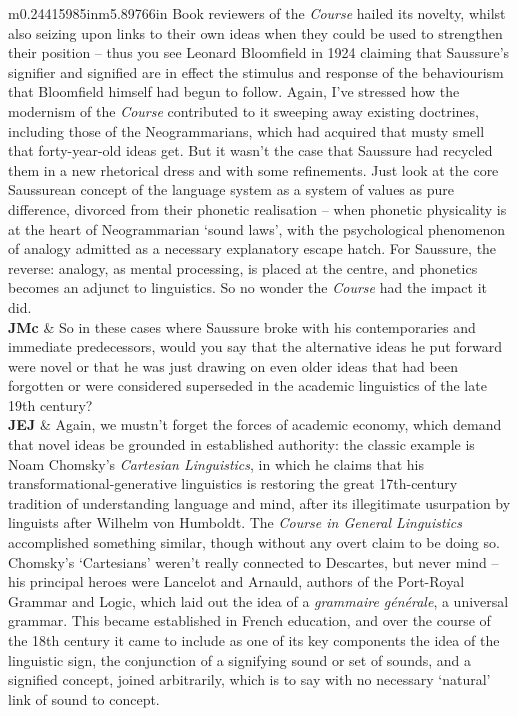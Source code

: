 \documentclass[12pt]{article}
\begin{document}
\begin{flushleft}
\begin{supertabular}{m{0.24415985in}m{5.89766in}}
Book reviewers of the \textit{Course} hailed its novelty, whilst also seizing upon links to their own ideas when they could be used to strengthen their position – thus you see Leonard Bloomfield in 1924 claiming that Saussure’s signifier and signified are in effect the stimulus and response of the behaviourism that Bloomfield himself had begun to follow. Again, I’ve stressed how the modernism of the \textit{Course} contributed to it sweeping away existing doctrines, including those of the Neogrammarians, which had acquired that musty smell that %
forty{}-year-old ideas get. But it wasn’t the case that Saussure had recycled them in a new rhetorical dress and with some refinements. Just look at the core Saussurean concept of the language system as a system of values as pure difference, divorced from their phonetic realisation – when phonetic physicality is at the heart of Neogrammarian ‘sound laws’, with the psychological phenomenon of analogy admitted as a necessary explanatory escape hatch. For Saussure, the reverse: analogy, as mental processing, is placed at the centre, and phonetics becomes an adjunct to linguistics. So no wonder the \textit{Course} had the impact it did.\\
\textbf{JMc}\newline
 &
So in these cases where Saussure broke with his contemporaries and immediate predecessors, would you say that the alternative ideas he put forward were novel or that he was just drawing on even older ideas that had been forgotten or were considered superseded in the academic linguistics of the late 19th century?\\
\textbf{JEJ}\newline
 &
Again, we mustn’t forget the forces of academic economy, which demand that novel ideas be grounded in established authority: the classic example is Noam Chomsky’s \textit{Cartesian Linguistics}, in which he claims that his transformational-generative linguistics is restoring the great 17th-century tradition of understanding language and mind, after its illegitimate usurpation by linguists after Wilhelm von Humboldt. The \textit{Course in General Linguistics} accomplished something similar, though without any overt claim to be doing so. Chomsky’s ‘Cartesians’ weren’t really connected to Descartes, but never mind – his principal heroes were Lancelot and Arnauld, authors of the Port-Royal Grammar and Logic, which laid out the idea of a \textit{grammaire générale}, a universal grammar. This became established in French education, and over the course of the 18th century it came to include as one of its key components the idea of the linguistic sign, the conjunction of a signifying sound or set of sounds, and a signified concept, joined arbitrarily, which is to say with no necessary ‘natural’ link of sound to concept. 


\end{supertabular}
\end{flushleft}
\end{document}
